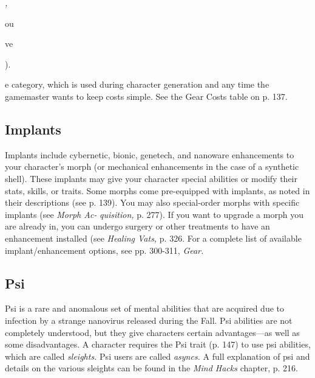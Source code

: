 \textit{,}

ou

ve 

). 

e
category, which is used during character generation 
and any time the gamemaster wants to keep costs 
simple. See the Gear Costs table on p. 137.

\subsection{Implants}

Implants include cybernetic, bionic, genetech, and 
nanoware enhancements to your character's morph 
(or mechanical enhancements in the case of a synthetic 
shell). These implants may give your character special 
abilities or modify their stats, skills, or traits. Some 
morphs come pre-equipped with implants, as noted in 
their descriptions (see p. 139). You may also special-order
morphs with specific implants (see \textit{Morph Ac-}
\textit{quisition,} p. 277). If you want to upgrade a morph 
you are already in, you can undergo surgery or other 
treatments to have an enhancement installed (see 
\textit{Healing Vats,} p. 326. For a complete list of available 
implant/enhancement options, see pp. 300-311, \textit{Gear.}

\subsection{Psi}

Psi is a rare and anomalous set of mental abilities that 
are acquired due to infection by a strange nanovirus 
released during the Fall. Psi abilities are not completely 
understood, but they give characters certain advantages—as
well as some disadvantages. A character
requires the Psi trait (p. 147) to use psi abilities, which 
are called \textit{sleights.} Psi users are called \textit{asyncs.} A full 
explanation of psi and details on the various sleights 
can be found in the \textit{Mind Hacks }chapter, p. 216.
